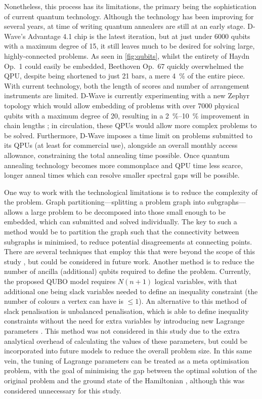 \documentclass[twocolumn]{article}
\theoremstyle{definition}
\begin{document}
Nonetheless, this process has its limitations, the primary being the sophistication of current quantum technology. Although the technology has been improving for several years, at time of writing quantum annealers are still at an early stage. D-Wave's Advantage 4.1 chip is the latest iteration, but at just under \num{6000} qubits with a maximum degree of \num{15}, it still leaves much to be desired for solving large, highly-connected problems. As seen in \cref{fig:qubits}, whilst the entirety of Haydn Op.\ 1 could easily be embedded, Beethoven Op.\ 67 quickly overwhelmed the QPU, despite being shortened to just \num{21} bars, a mere \qty{4}{\%} of the entire piece. With current technology, both the length of scores and number of arrangement instruments are limited. D-Wave is currently experimenting with a new Zephyr topology which would allow embedding of problems with over \num{7000} physical qubits with a maximum degree of \num{20}, resulting in a \qtyrange{2}{10}{\%} improvement in chain lengths \cite{dwave_zephyr}; in circulation, these QPUs would allow more complex problems to be solved.
Furthermore, D-Wave imposes a time limit on problems submitted to its QPUs (at least for commercial use), alongside an overall monthly access allowance, constraining the total annealing time possible. Once quantum annealing technology becomes more commonplace and QPU time less scarce, longer anneal times which can resolve smaller spectral gaps will be possible.

One way to work with the technological limitations is to reduce the complexity of the problem. Graph partitioning---splitting a problem graph into subgraphs---allows a large problem to be decomposed into those small enough to be embedded, which can submitted and solved individually. The key to such a method would be to partition the graph such that the connectivity between subgraphs is minimised, to reduce potential disagreements at connecting points. There are several techniques that employ this that were beyond the scope of this study \cite{dwave_decomposing}, but could be considered in future work.
Another method is to reduce the number of ancilla (additional) qubits required to define the problem. Currently, the proposed QUBO model requires $N(n+1)$ logical variables, with that additional one being slack variables needed to define an inequality constraint (the number of colours a vertex can have is $\le1$). An alternative to this method of slack penalisation is unbalanced penalisation, which is able to define inequality constraints without the need for extra variables by introducing new Lagrange parameters \cite{montanez-barrera_unbalanced_2024}. This method was not considered in this study due to the extra analytical overhead of calculating the values of these parameters, but could be incorporated into future models to reduce the overall problem size. In this same vein, the tuning of Lagrange parameters can be treated as a meta optimisation problem, with the goal of minimising the gap between the optimal solution of the original problem and the ground state of the Hamiltonian \cite{montanez-barrera_unbalanced_2024}, although this was considered unnecessary for this study.
\end{document}
